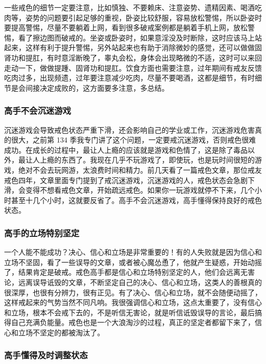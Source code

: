 一些戒色的细节一定要注意，比如慎独、不要赖床、注意姿势、遗精因素、喝酒吃肉等，姿势的问题要引起足够的重视，卧姿比较舒服，容易放松警惕，所以卧姿时要提高警惕，尽量不要躺着上网，看到很多破戒案例都是躺着手机上网，放松警惕，看了擦边图而破戒的。坐姿或卧姿时，如果意淫没及时断除，这时应该马上站起来，这样有利于提升警惕，另外站起来也有助于消除微妙的感觉，还可以做做固肾功和提肛，有时意淫断晚了，睾丸会松，身体会出现略微的不适，这时可以来回走动一下，做做提踵、固肾功和提肛。饮食方面也需要注意，过年期间有戒友反馈吃肉过多，出现频遗，过年要注意减少吃肉，尽量不要喝酒，这都是细节，有时细节是会间接决定成败的，这方面要多注意，多总结。

\subsubsection{高手不会沉迷游戏}

沉迷游戏会导致戒色状态严重下滑，还会影响自己的学业或工作，沉迷游戏危害真的很大，之前第 134 季我专门讲了这个问题，一定要戒沉迷游戏，否则戒色很难成功。在成长的过程中，最让人上瘾的应该就是游戏和色情了，这是除了毒品以外，最让人上瘾的东西了。我现在几乎不玩游戏了，即使玩，也是玩时间很短的游戏，绝对不会去玩网游，太浪费时间和精力。前几天看了一篇戒色文章，那位戒友戒色四年，文章里面专门提到了戒沉迷游戏，沉迷游戏的人，戒色状态会急剧下滑，会变得不想看戒色文章，开始疏远戒色。如果你一玩游戏就停不下来，几个小时甚至十几个小时，这就要反省了。高手不会沉迷游戏，高手懂得保持良好的戒色状态。

\subsubsection{高手的立场特别坚定}

一个人能不能成功？决心、信心和立场是非常重要的！有的人失败就是因为信心和立场不坚固，看了一些误导的文章，或者被心魔怂恿了，他就产生疑惑，开始动摇了，结果肯定是破戒。戒色高手都是信心和立场特别坚定的人，他们会远离无害论，远离误导诋毁的文章，不断坚定自己的决心、信心和立场，这类人的善根真的很深厚，也很有分辨力，很有正见。有了决心、信心和立场，就不会随便动摇了，这样戒起来的气势当然不同凡响。我很强调信心和立场，这点太重要了，没有信心和立场，根本不会戒下去的，不是听信无害论，就是听信诋毁误导的言论，最后搞得自己充满负能量。戒色也是一个大浪淘沙的过程，真正的坚定者都留下来了，信心和立场不坚定的都被淘汰了。

\subsubsection{高手懂得及时调整状态}

